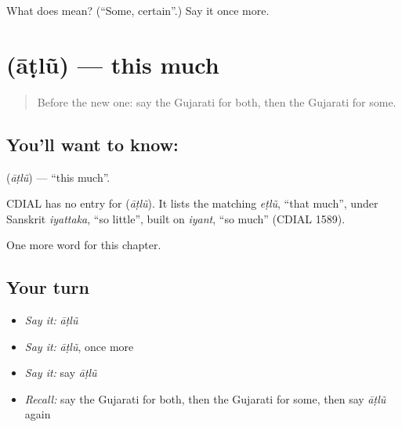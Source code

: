 \begin{tcolorbox}[breakable,colback=teal!4,colframe=teal!35!black,title={Before you move on}]
What does  mean? (\textquotedblleft{}Some, certain\textquotedblright{}.) Say it once more.
\end{tcolorbox}
\section[\texorpdfstring{\gu{આટલું} (āṭlũ)}{આટલું (āṭlũ)}]{ (āṭlũ) — this much}

\label{lesson:GU-C101-atlu}



\begin{quote}
Before the new one: say the Gujarati for both, then the Gujarati for some.
\end{quote}

\subsection*{You'll want to know: }
\textbf{} (\emph{āṭlũ}) — \textquotedblleft{}this much\textquotedblright{}.

\begin{cousinweb}
CDIAL has no entry for \textbf{} (\emph{āṭlũ}). It lists the matching \emph{eṭlũ}, \textquotedblleft{}that much\textquotedblright{}, under Sanskrit \emph{iyattaka}, \textquotedblleft{}so little\textquotedblright{}, built on \emph{iyant}, \textquotedblleft{}so much\textquotedblright{} (CDIAL 1589).
\end{cousinweb}

\begin{grammarlens}[title={What you've built}]
One more word for this chapter.
\end{grammarlens}

\subsection*{Your turn}
\begin{itemize}
\raggedright
  \item \emph{Say it:} \emph{āṭlũ}
  \item \emph{Say it:} \emph{āṭlũ}, once more
  \item \emph{Say it:} say \emph{āṭlũ}
  \item \emph{Recall:} say the Gujarati for both, then the Gujarati for some, then say \emph{āṭlũ} again
\end{itemize}

